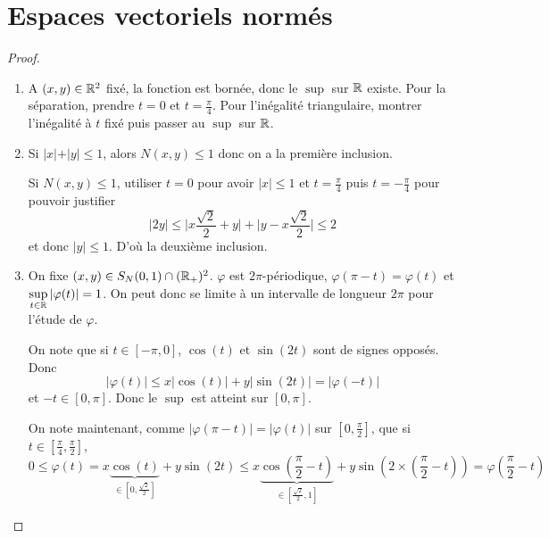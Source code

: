 \section{Espaces vectoriels normés}

\begin{proof}
	\phantom{}
	\begin{enumerate}
		\item A $(x,y)\in\mathbb{R}^{2}$ fixé, la fonction 
		est bornée, donc le $\sup$ sur $\mathbb{R}$ existe. Pour la séparation, prendre $t=0$ et $t=\frac{\pi}{4}$. Pour l'inégalité triangulaire, montrer l'inégalité à $t$ fixé puis passer au $\sup$ sur $\mathbb{R}$.
		
		\item Si $\vert x\vert+\vert y\vert\leqslant1$, alors $N(x,y)\leqslant 1$ donc on a la première inclusion. 
		
		Si $N(x,y)\leqslant 1$, utiliser $t=0$ pour avoir $\vert x\vert\leqslant1$ et $t=\frac{\pi}{4}$ puis $t=-\frac{\pi}{4}$ pour pouvoir justifier
		\begin{equation}\vert 2y\vert\leqslant \Biggl\vert x\frac{\sqrt{2}}{2}+y\Biggr\vert+\Biggl\vert y-x\frac{\sqrt{2}}{2}\Biggr\vert\leqslant 2\end{equation}
		et donc $\vert y\vert\leqslant1$. D'où la deuxième inclusion. 

		\item On fixe $(x,y)\in S_{N}(0,1)\cap(\mathbb{R}_{+})^{2}$. $\varphi$ est $2\pi$-périodique, $\varphi(\pi-t)=\varphi(t)$ et $\sup\limits_{t\in\mathbb{R}}\vert\varphi(t)\vert=1$. On peut donc se limite à un intervalle de longueur $2\pi$ pour l'étude de $\varphi$. 
		
		On note que si $t\in[-\pi,0]$, $\cos(t)$ et $\sin(2t)$ sont de signes opposés. Donc
		\begin{equation}\vert\varphi(t)\vert\leqslant x\vert\cos(t)\vert+y\vert\sin(2t)\vert=\vert\varphi(-t)\vert\end{equation}
		et $-t\in[0,\pi]$. Donc le $\sup$ est atteint sur $[0,\pi]$.

		On note maintenant, comme $\vert\varphi(\pi-t)\vert=\vert\varphi(t)\vert$ sur $[0,\frac{\pi}{2}]$, que si $t\in[\frac{\pi}{4},\frac{\pi}{2}]$,
		\begin{equation}0\leqslant\varphi(t)=x\underbrace{\cos(t)}_{\in[0,\frac{\sqrt{2}}{2}]}+y\sin(2t)\leqslant x\underbrace{\cos(\frac{\pi}{2}-t)}_{\in[\frac{\sqrt{2}}{2},1]}+y\sin(2\times (\frac{\pi}{2}-t))=\varphi(\frac{\pi}{2}-t)\end{equation}


\end{enumerate}
\end{proof}
